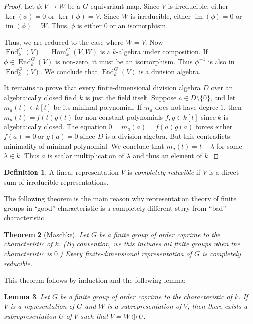 \documentclass[12pt]{article}
\theoremstyle{plain}
\newtheorem{theorem}{Theorem}[section]
\newtheorem{lemma}[theorem]{Lemma}
\theoremstyle{definition}
\newtheorem{definition}[theorem]{Definition}
\theoremstyle{remark}
\numberwithin{equation}{section}
\begin{document}
\begin{proof}
Let $\phi : V \to W$ be a $G$-equivariant map.
Since $V$ is irreducible, either $\ker(\phi)=0$ or $\ker(\phi)=V$.
Since $W$ is irreducible, either $\operatorname{im}(\phi)=0$
or $\operatorname{im}(\phi)=W$.
Thus, $\phi$ is either $0$ or an isomorphism.

Thus, we are reduced to the case where $W=V$.
Now $\operatorname{End}^G_k(V)=\operatorname{Hom}_k^G(V,W)$
is a $k$-algebra under composition.
If $\phi \in \operatorname{End}^G_k(V)$ is non-zero, it must be an isomorphism.
Thus $\phi^{-1}$ is also in $\operatorname{End}^G_k(V)$.
We conclude that $\operatorname{End}^G_k(V)$ is a division algebra.

It remains to prove that every finite-dimensional division algebra $D$
over an algebraically closed field $k$ is just the field itself.
Suppose $a \in D \setminus \{0\} $,
and let $m_a(t) \in k[t]$ be its minimal polynomial.
If $m_a$ does not have degree $1$, then $m_a(t)=f(t)g(t)$
for non-constant polynomials $f,g \in k[t]$ since $k$ is algebraically
closed.
The equation $0=m_a(a)=f(a)g(a)$ forces either $f(a)=0$ or $g(a)=0$
since $D$ is a division algebra.  But this contradicts minimality of
minimal polynomial.  We conclude that $m_a(t)=t-\lambda$ for some
$\lambda \in k$.  Thus $a$ is scalar multiplication of $\lambda$
and thus an element of $k$.
\end{proof}

\begin{definition}
A linear representation $V$ is \emph{completely reducible}
if $V$ is a direct sum of irreducible representations.
\end{definition}

The following theorem is the main reason why representation theory of finite
groups in ``good'' characteristic is a completely different story from
``bad'' characteristic.

\begin{theorem}[Maschke]
Let $G$ be a finite group of order coprime to the characteristic of $k$.
(By convention, we this includes all finite groups when the
characteristic is $0$.)
Every finite-dimensional representation of $G$ is completely reducible.
\end{theorem}

This theorem follows by induction and the following lemma:

\begin{lemma}
Let $G$ be a finite group of order coprime to the characteristic of $k$.
If $V$ is a representation of $G$ and $W$ is a subrepresentation of $V$,
then there exists a subrepresentation $U$ of $V$
such that $V= W \oplus U$.
\end{lemma}
\end{document}
